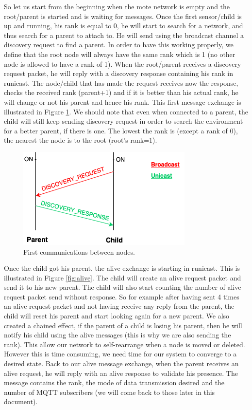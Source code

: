 \documentclass[a4paper,10pt]{article}
\begin{document}
So let us start from the beginning when the mote network is empty and the root/parent is started and is waiting for messages. Once the first sensor/child is up and running, his rank is equal to 0, he will start to search for a network, and thus search for a parent to attach to. He will send using the broadcast channel a discovery request to find a parent. In order to have this working properly, we define that the root node will always have the same rank which is 1 (no other node is allowed to have a rank of 1). When the root/parent receives a discovery request packet, he will reply with a discovery response containing his rank in runicast. The node/child that has made the request receives now the response, checks the received rank (parent+1) and if it is better than his actual rank, he will change or not his parent and hence his rank. This first message exchange is illustrated in Figure \ref{fig:bd}. We should note that even when connected to a parent, the child will still keep sending discovery request in order to search the environment for a better parent, if there is one. The lowest the rank is (except a rank of 0), the nearest the node is to the root (root's rank=1).\\

\begin{figure}[!htb]
\centering
\includegraphics[scale=0.6]{./img/discovery.png}
\caption{First communications between nodes.}
\label{fig:bd}
\end{figure}

Once the child got his parent, the alive exchange is starting in runicast. This is illustrated in Figure \ref{fig:alive}. The child will create an alive request packet and send it to his new parent. The child will also start counting the number of alive request packet send without response. So for example after having sent 4 times an alive request packet and not having receive any reply from the parent, the child will reset his parent and start looking again for a new parent. We also created a chained effect, if the parent of a child is losing his parent, then he will notify his child using the alive messages (this is why we are also sending the rank). This allow our network to self-rearrange when a node is moved or deleted.  However this is time consuming, we need time for our system to converge to a desired state. Back to our alive message exchange, when the parent receives an alive request, he will reply with an alive response to validate his presence. The message contains the rank, the mode of data transmission desired and the number of MQTT subscribers (we will come back to those later in this document).\\
\end{document}
